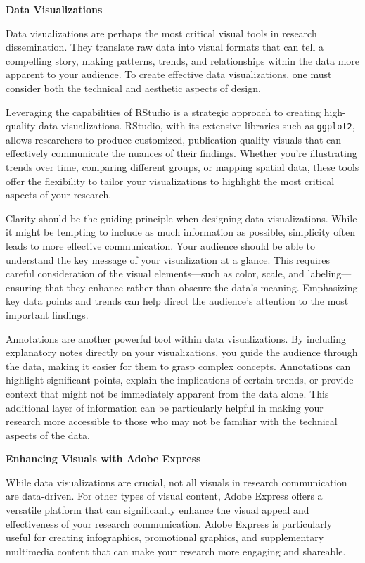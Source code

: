 \documentclass[
]{book}
\begin{document}
\textbf{Data Visualizations}

Data visualizations are perhaps the most critical visual tools in research dissemination. They translate raw data into visual formats that can tell a compelling story, making patterns, trends, and relationships within the data more apparent to your audience. To create effective data visualizations, one must consider both the technical and aesthetic aspects of design.

Leveraging the capabilities of RStudio is a strategic approach to creating high-quality data visualizations. RStudio, with its extensive libraries such as \texttt{ggplot2}, allows researchers to produce customized, publication-quality visuals that can effectively communicate the nuances of their findings. Whether you're illustrating trends over time, comparing different groups, or mapping spatial data, these tools offer the flexibility to tailor your visualizations to highlight the most critical aspects of your research.

Clarity should be the guiding principle when designing data visualizations. While it might be tempting to include as much information as possible, simplicity often leads to more effective communication. Your audience should be able to understand the key message of your visualization at a glance. This requires careful consideration of the visual elements---such as color, scale, and labeling---ensuring that they enhance rather than obscure the data's meaning. Emphasizing key data points and trends can help direct the audience's attention to the most important findings.

Annotations are another powerful tool within data visualizations. By including explanatory notes directly on your visualizations, you guide the audience through the data, making it easier for them to grasp complex concepts. Annotations can highlight significant points, explain the implications of certain trends, or provide context that might not be immediately apparent from the data alone. This additional layer of information can be particularly helpful in making your research more accessible to those who may not be familiar with the technical aspects of the data.

\textbf{Enhancing Visuals with Adobe Express}

While data visualizations are crucial, not all visuals in research communication are data-driven. For other types of visual content, Adobe Express offers a versatile platform that can significantly enhance the visual appeal and effectiveness of your research communication. Adobe Express is particularly useful for creating infographics, promotional graphics, and supplementary multimedia content that can make your research more engaging and shareable.
\end{document}
